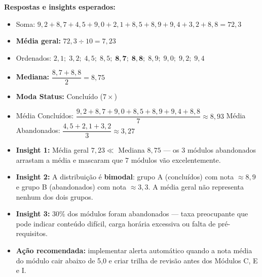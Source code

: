 \begin{BoardBox}
\smallskip
\textbf{Respostas e insights esperados:}
\begin{itemize}
  \item Soma: $9{,}2+8{,}7+4{,}5+9{,}0+2{,}1+8{,}5+8{,}9+9{,}4+3{,}2+8{,}8 = 72{,}3$
  \item \textbf{Média geral:} $72{,}3 \div 10 = 7{,}23$
  \item Ordenados: $2{,}1;\; 3{,}2;\; 4{,}5;\; 8{,}5;\; \mathbf{8{,}7;\; 8{,}8};\; 8{,}9;\;9{,}0;\; 9{,}2;\; 9{,}4$
  \item \textbf{Mediana:} $\dfrac{8{,}7+8{,}8}{2} = 8{,}75$
  \item \textbf{Moda Status:} Concluído ($7\times$)
  \item Média Concluídos: $\dfrac{9{,}2+8{,}7+9{,}0+8{,}5+8{,}9+9{,}4+8{,}8}{7} \approx 8{,}93$
    \quad Média Abandonados: $\dfrac{4{,}5+2{,}1+3{,}2}{3} \approx 3{,}27$
  \item \textbf{Insight 1:} Média geral $7{,}23 \ll$ Mediana $8{,}75$ — os 3 módulos
  abandonados arrastam a média e mascaram que 7 módulos vão excelentemente.
  \item \textbf{Insight 2:} A distribuição é \textbf{bimodal}: grupo A
  (concluídos) com nota $\approx 8{,}9$ e grupo B (abandonados) com nota
  $\approx 3{,}3$. A média geral não representa nenhum dos dois grupos.
  \item \textbf{Insight 3:} 30\% dos módulos foram abandonados — taxa preocupante
  que pode indicar conteúdo difícil, carga horária excessiva ou falta de pré-requisitos.
  \item \textbf{Ação recomendada:} implementar alerta automático quando a nota
  média do módulo cair abaixo de 5,0 e criar trilha de revisão antes dos
  Módulos C, E e I.
\end{itemize}
\end{BoardBox}

